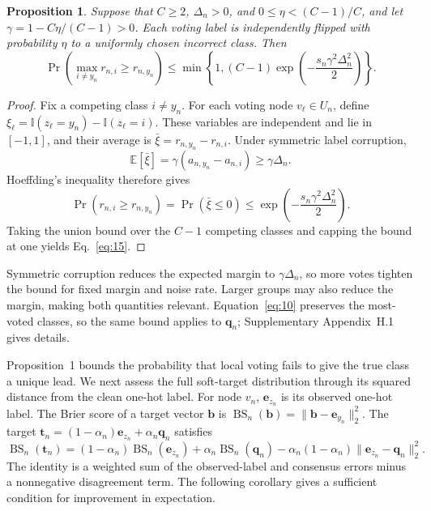 \documentclass[times,review,10pt]{elsarticle}
\theoremstyle{definition}
\theoremstyle{plain}
\newtheorem{proposition}{Proposition}
\begin{document}
\begin{proposition}\label{prop:local_vote}
Suppose that \(C\geq2\), \(\Delta_n>0\), and \(0\leq\eta<(C-1)/C\), and let \(\gamma=1-C\eta/(C-1)>0\). Each voting label is independently flipped with probability \(\eta\) to a uniformly chosen incorrect class. Then
\begin{equation}\label{eq:15}
\Pr\!\left(\max_{i\ne y_n}r_{n,i}\geq r_{n,y_n}\right)
\leq\min\!\left\{1,(C-1)\exp\!\left(-\frac{s_n\gamma^2\Delta_n^2}{2}\right)\right\}.
\end{equation}
\end{proposition}

\begin{proof}
\renewcommand{\qedsymbol}{}
Fix a competing class \(i\ne y_n\). For each voting node \(v_\ell\in U_n\), define \(\xi_\ell=\mathbb I(z_\ell=y_n)-\mathbb I(z_\ell=i)\). These variables are independent and lie in \([-1,1]\), and their average is \(\bar\xi=r_{n,y_n}-r_{n,i}\). Under symmetric label corruption,
\[
\mathbb E[\bar\xi]=\gamma(a_{n,y_n}-a_{n,i})\geq\gamma\Delta_n.
\]
Hoeffding's inequality \cite{hoeffding1963} therefore gives
\[
\Pr\!\left(r_{n,i}\geq r_{n,y_n}\right)=\Pr(\bar\xi\leq0)
\leq\exp\!\left(-\frac{s_n\gamma^2\Delta_n^2}{2}\right).
\]
Taking the union bound over the \(C-1\) competing classes and capping the bound at one yields Eq.~\eqref{eq:15}.
\end{proof}

Symmetric corruption reduces the expected margin to \(\gamma\Delta_n\), so more votes tighten the bound for fixed margin and noise rate. Larger groups may also reduce the margin, making both quantities relevant. Equation~\eqref{eq:10} preserves the most-voted classes, so the same bound applies to \(\mathbf q_n\); Supplementary Appendix~H.1 gives details.

Proposition~1 bounds the probability that local voting fails to give the true class a unique lead. We next assess the full soft-target distribution through its squared distance from the clean one-hot label. For node \(v_n\), \(\mathbf e_{z_n}\) is its observed one-hot label. The Brier score of a target vector \(\mathbf b\) is \(\operatorname{BS}_n(\mathbf b)=\|\mathbf b-\mathbf e_{y_n}\|_2^2\). The target \(\mathbf t_n=(1-\alpha_n)\mathbf e_{z_n}+\alpha_n\mathbf q_n\) satisfies
\begin{equation}\label{eq:16}
\operatorname{BS}_n(\mathbf t_n)=(1-\alpha_n)\operatorname{BS}_n(\mathbf e_{z_n})+\alpha_n\operatorname{BS}_n(\mathbf q_n)-\alpha_n(1-\alpha_n)\|\mathbf e_{z_n}-\mathbf q_n\|_2^2.
\end{equation}
The identity is a weighted sum of the observed-label and consensus errors minus a nonnegative disagreement term. The following corollary gives a sufficient condition for improvement in expectation.
\end{document}
